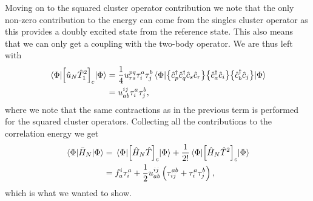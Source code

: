         Moving on to the squared cluster operator contribution we note that the
        only non-zero contribution to the energy can come from the singles
        cluster operator as this provides a doubly excited state from the
        reference state.
        This also means that we can only get a coupling with the two-body
        operator.
        We are thus left with
        \begin{align}
            \mel{\Phi}{
                \left[ 
                    \hat{u}_N \hat{T}_1^2
                 \right]_c
            }{\Phi}
            &=
            \frac{1}{4}u^{pq}_{rs}\tau^{a}_{i}\tau^{b}_{j}
            \mel{\Phi}{
                \bigl\{ 
                    \hat{c}_{p}^{\dagger}
                    \hat{c}_{q}^{\dagger}
                    \hat{c}_{s}
                    \hat{c}_{r}
                 \bigr\}
                \bigl\{ 
                    \hat{c}_{a}^{\dagger}
                    \hat{c}_{i}
                 \bigr\}
                \bigl\{ 
                    \hat{c}_{b}^{\dagger}
                    \hat{c}_{j}
                 \bigr\}
            }{\Phi}
            \\
            &=
            u^{ij}_{ab}\tau^{a}_{i}\tau^{b}_{j},
        \end{align}
        where we note that the same contractions as in the previous term is
        performed for the squared cluster operators.
        Collecting all the contributions to the correlation energy we get
        \begin{align}
            \mel{\Phi}{\bar{H}_N}{\Phi}
            &=
            \mel{\Phi}{
                \left[ 
                    \hat{H}_N\hat{T}\right]_{c}
            }{\Phi}
            + \frac{1}{2!}
            \mel{\Phi}{
                \left[ 
                    \hat{H}_N\hat{T}^2
                 \right]_{c}
            }{\Phi}
            \\
            &=
            f^{i}_{a}\tau^{a}_{i}
            + \frac{1}{2} u^{ij}_{ab}\left( 
                \tau^{ab}_{ij}
                + \tau^{a}_{i}\tau^{b}_{j}
             \right),
        \end{align}
        which is what we wanted to show.

